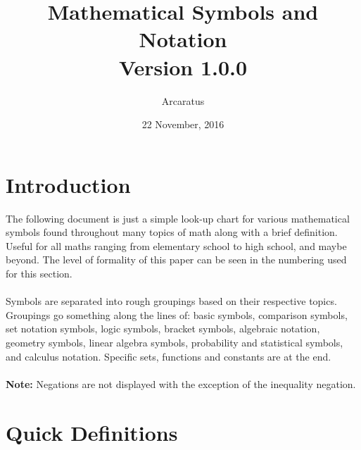 \documentclass{article}
\title{Mathematical Symbols and Notation\\
        \large{Version 1.0.0}}
\author{Arcaratus}
\date{22 November, 2016}
\begin{document}
\maketitle

\setcounter{section}{-1}
\section{Introduction}
The following document is just a simple look-up chart for various mathematical
symbols found throughout many topics of math along with a brief definition. Useful for all maths ranging from elementary school to high school, and maybe beyond. The level of formality of this paper can be seen in the numbering used for this section.\\
\\
Symbols are separated into rough groupings based on their respective topics. Groupings go something along the lines of: basic symbols, comparison symbols, set notation symbols, logic symbols, bracket symbols, algebraic notation, geometry symbols, linear algebra symbols, probability and statistical symbols, and calculus notation. Specific sets, functions and constants are at the end.\\
\\
\textbf{Note:} Negations are not displayed with the exception of the inequality negation.

\section{Quick Definitions}
\end{document}
